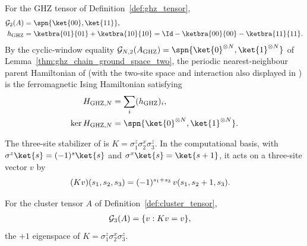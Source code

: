 \begin{remark}\label{rem:ghz_parent_interaction}
    For the GHZ tensor of Definition~\ref{def:ghz_tensor},
    \begin{align}
        \mathcal G_2(A)
         & = \spn\{\ket{00},\ket{11}\}, \notag \\
        h_{\mathrm{GHZ}}
         & = \ketbra{01}{01}+\ketbra{10}{10}
        = \Id-\ketbra{00}{00}-\ketbra{11}{11}.
        \notag
    \end{align}
    By the cyclic-window equality
    $\mathcal G_{N,2}(A_{\mathrm{GHZ}})
        =\spn\{\ket{0}^{\otimes N},\ket{1}^{\otimes N}\}$ of
    Lemma~\ref{thm:ghz_chain_ground_space_two}, the periodic
    nearest-neighbour parent Hamiltonian of
    \cite[lines~1194--1196 and line~2205]{Cirac2021Matrix} (with the two-site
    space and interaction also displayed in
    \cite[Section~3]{FernandezGonzalez2015Uncle}) is the ferromagnetic Ising
    Hamiltonian satisfying
    \begin{align}
        H_{\mathrm{GHZ},N}
         & = \sum_i (h_{\mathrm{GHZ}})_i, \notag              \\
        \ker H_{\mathrm{GHZ},N}
         & = \spn\{\ket{0}^{\otimes N},\ket{1}^{\otimes N}\}.
        \notag
    \end{align}
\end{remark}

\begin{definition}\label{def:cluster_stabilizer}
    \leanok
    The three-site stabilizer of \cite[local TeX lines~374--387]{PerezGarcia2007Matrix}
    is $K = \sigma^z_1\sigma^x_2\sigma^z_3$. In the computational basis, with
    $\sigma^z\ket{s} = (-1)^s\ket{s}$ and $\sigma^x\ket{s} = \ket{s+1}$, it acts
    on a three-site vector $v$ by
    \begin{align}
        (Kv)(s_1,s_2,s_3)
         & = (-1)^{s_1+s_3}\, v(s_1, s_2+1, s_3).
        \notag
    \end{align}
\end{definition}

\begin{lemma}
    \label{thm:cluster_ground_space_three_eigenspace}
    \leanok
    For the cluster tensor $A$ of Definition~\ref{def:cluster_tensor},
    \begin{align}
        \mathcal G_3(A)
         & = \{v : Kv = v\},
        \notag
    \end{align}
    the $+1$ eigenspace of $K = \sigma^z_1\sigma^x_2\sigma^z_3$.
\end{lemma}

